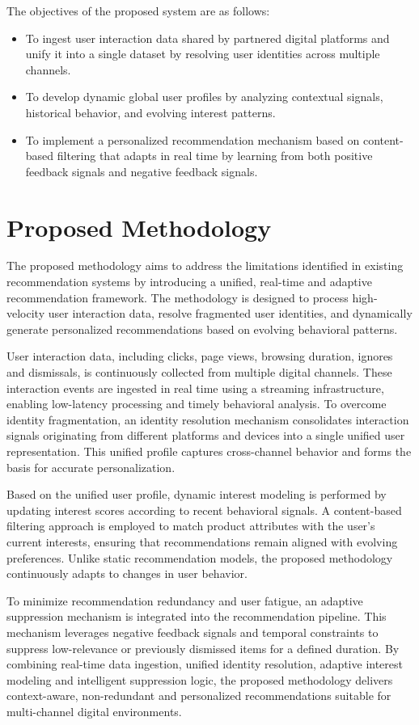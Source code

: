 \documentclass[conference]{IEEEtran}
\begin{document}
The objectives of the proposed system are as follows:
\begin{itemize}
    \item To ingest user interaction data shared by partnered digital platforms and unify it into a single dataset by resolving user identities across multiple channels.
    \item To develop dynamic global user profiles by analyzing contextual signals, historical behavior, and evolving interest patterns.
    \item To implement a personalized recommendation mechanism based on content-based filtering that adapts in real time by learning from both positive feedback signals and negative feedback signals.
\end{itemize}

\section{Proposed Methodology}
The proposed methodology aims to address the limitations identified in existing recommendation systems by introducing a unified, real-time and adaptive recommendation framework. The methodology is designed to process high-velocity user interaction data, resolve fragmented user identities, and dynamically generate personalized recommendations based on evolving behavioral patterns.

User interaction data, including clicks, page views, browsing duration, ignores and dismissals, is continuously collected from multiple digital channels. These interaction events are ingested in real time using a streaming infrastructure, enabling low-latency processing and timely behavioral analysis. To overcome identity fragmentation, an identity resolution mechanism consolidates interaction signals originating from different platforms and devices into a single unified user representation. This unified profile captures cross-channel behavior and forms the basis for accurate personalization.

Based on the unified user profile, dynamic interest modeling is performed by updating interest scores according to recent behavioral signals. A content-based filtering approach is employed to match product attributes with the user's current interests, ensuring that recommendations remain aligned with evolving preferences. Unlike static recommendation models, the proposed methodology continuously adapts to changes in user behavior.

To minimize recommendation redundancy and user fatigue, an adaptive suppression mechanism is integrated into the recommendation pipeline. This mechanism leverages negative feedback signals and temporal constraints to suppress low-relevance or previously dismissed items for a defined duration. By combining real-time data ingestion, unified identity resolution, adaptive interest modeling and intelligent suppression logic, the proposed methodology delivers context-aware, non-redundant and personalized recommendations suitable for multi-channel digital environments.
\end{document}
